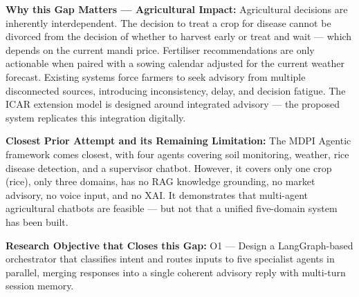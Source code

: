 \documentclass[12pt,a4paper]{article}
\begin{document}
\noindent\textbf{Why this Gap Matters --- Agricultural Impact:}
Agricultural decisions are inherently interdependent. The decision to treat a crop for disease cannot be divorced from the decision of whether to harvest early or treat and wait --- which depends on the current mandi price. Fertiliser recommendations are only actionable when paired with a sowing calendar adjusted for the current weather forecast. Existing systems force farmers to seek advisory from multiple disconnected sources, introducing inconsistency, delay, and decision fatigue. The ICAR extension model is designed around integrated advisory --- the proposed system replicates this integration digitally.

\noindent\textbf{Closest Prior Attempt and its Remaining Limitation:}
The MDPI Agentic framework \cite{agenticmdpi2026} comes closest, with four agents covering soil monitoring, weather, rice disease detection, and a supervisor chatbot. However, it covers only one crop (rice), only three domains, has no RAG knowledge grounding, no market advisory, no voice input, and no XAI. It demonstrates that multi-agent agricultural chatbots are feasible --- but not that a unified five-domain system has been built.

\noindent\textbf{Research Objective that Closes this Gap:}
O1 --- Design a LangGraph-based orchestrator that classifies intent and routes inputs to five specialist agents in parallel, merging responses into a single coherent advisory reply with multi-turn session memory.
\end{document}
